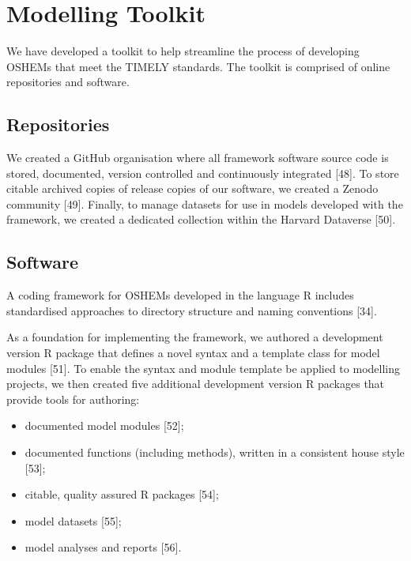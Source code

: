 \documentclass[
]{article}
\begin{document}
\hypertarget{modelling-toolkit}{%
\section{Modelling Toolkit}\label{modelling-toolkit}}

We have developed a toolkit to help streamline the process of developing OSHEMs that meet the TIMELY standards. The toolkit is comprised of online repositories and software.

\hypertarget{repositories}{%
\subsection{\texorpdfstring{Repositories }{Repositories }}\label{repositories}}

We created a GitHub organisation where all framework software source code is stored, documented, version controlled and continuously integrated {[}48{]}. To store citable archived copies of release copies of our software, we created a Zenodo community {[}49{]}. Finally, to manage datasets for use in models developed with the framework, we created a dedicated collection within the Harvard Dataverse {[}50{]}.

\hypertarget{software}{%
\subsection{\texorpdfstring{Software }{Software }}\label{software}}

A coding framework for OSHEMs developed in the language R includes standardised approaches to directory structure and naming conventions {[}34{]}.

As a foundation for implementing the framework, we authored a development version R package that defines a novel syntax and a template class for model modules {[}51{]}. To enable the syntax and module template be applied to modelling projects, we then created five additional development version R packages that provide tools for authoring:

\begin{itemize}
\item
  documented model modules {[}52{]};
\item
  documented functions (including methods), written in a consistent house style {[}53{]};
\item
  citable, quality assured R packages {[}54{]};
\item
  model datasets {[}55{]};
\item
  model analyses and reports {[}56{]}.
\end{itemize}
\end{document}
